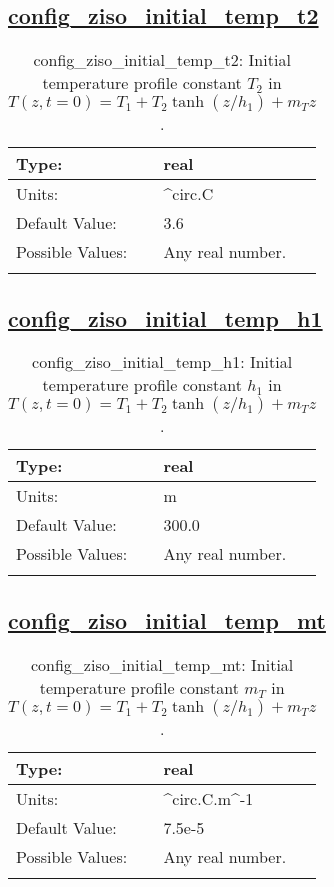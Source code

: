 \subsection[config\_ziso\_initial\_temp\_t2]{\hyperref[sec:nm_tab_ziso]{config\_ziso\_initial\_temp\_t2}}
\label{subsec:nm_sec_config_ziso_initial_temp_t2}
\begin{center}
\begin{longtable}{| p{2.0in} || p{4.0in} |}
    \hline
    Type: & real \\
    \hline
    Units: & \si{^{circ}.C} \\
    \hline
    Default Value: & 3.6 \\
    \hline
    Possible Values: & Any real number. \\
    \hline
    \caption{config\_ziso\_initial\_temp\_t2: Initial temperature profile constant $T_2$ in $T(z,t=0) = T_1 + T_2 \tanh(z/h_1) + m_T z$.}
\end{longtable}
\end{center}
\subsection[config\_ziso\_initial\_temp\_h1]{\hyperref[sec:nm_tab_ziso]{config\_ziso\_initial\_temp\_h1}}
\label{subsec:nm_sec_config_ziso_initial_temp_h1}
\begin{center}
\begin{longtable}{| p{2.0in} || p{4.0in} |}
    \hline
    Type: & real \\
    \hline
    Units: & \si{m} \\
    \hline
    Default Value: & 300.0 \\
    \hline
    Possible Values: & Any real number. \\
    \hline
    \caption{config\_ziso\_initial\_temp\_h1: Initial temperature profile constant $h_1$ in $T(z,t=0) = T_1 + T_2 \tanh(z/h_1) + m_T z$.}
\end{longtable}
\end{center}
\subsection[config\_ziso\_initial\_temp\_mt]{\hyperref[sec:nm_tab_ziso]{config\_ziso\_initial\_temp\_mt}}
\label{subsec:nm_sec_config_ziso_initial_temp_mt}
\begin{center}
\begin{longtable}{| p{2.0in} || p{4.0in} |}
    \hline
    Type: & real \\
    \hline
    Units: & \si{^{circ}.C.m^{-1}} \\
    \hline
    Default Value: & 7.5e-5 \\
    \hline
    Possible Values: & Any real number. \\
    \hline
    \caption{config\_ziso\_initial\_temp\_mt: Initial temperature profile constant $m_T$ in $T(z,t=0) = T_1 + T_2 \tanh(z/h_1) + m_T z$.}
\end{longtable}
\end{center}
